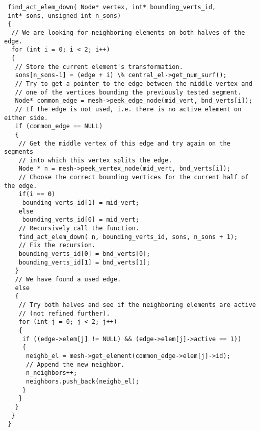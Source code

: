 \begin{lstlisting}
 find_act_elem_down( Node* vertex, int* bounding_verts_id,
 int* sons, unsigned int n_sons)
 {
  // We are looking for neighboring elements on both halves of the edge.
  for (int i = 0; i < 2; i++)
  {
   // Store the current element's transformation.
   sons[n_sons-1] = (edge + i) \% central_el->get_num_surf();
   // Try to get a pointer to the edge between the middle vertex and
   // one of the vertices bounding the previously tested segment.
   Node* common_edge = mesh->peek_edge_node(mid_vert, bnd_verts[i]);
   // If the edge is not used, i.e. there is no active element on either side.
   if (common_edge == NULL) 
   {
    // Get the middle vertex of this edge and try again on the segments
    // into which this vertex splits the edge.
    Node * n = mesh->peek_vertex_node(mid_vert, bnd_verts[i]);
    // Choose the correct bounding vertices for the current half of the edge.
    if(i == 0)
     bounding_verts_id[1] = mid_vert;
    else
     bounding_verts_id[0] = mid_vert;
    // Recursively call the function.
    find_act_elem_down( n, bounding_verts_id, sons, n_sons + 1);
    // Fix the recursion.
    bounding_verts_id[0] = bnd_verts[0];
    bounding_verts_id[1] = bnd_verts[1];
   }
   // We have found a used edge.
   else
   {
    // Try both halves and see if the neighboring elements are active
    // (not refined further).
    for (int j = 0; j < 2; j++)
    {
     if ((edge->elem[j] != NULL) && (edge->elem[j]->active == 1))
     {
      neighb_el = mesh->get_element(common_edge->elem[j]->id);
      // Append the new neighbor.
      n_neighbors++;
      neighbors.push_back(neighb_el);
     }
    }
   }
  }
 }
\end{lstlisting}
